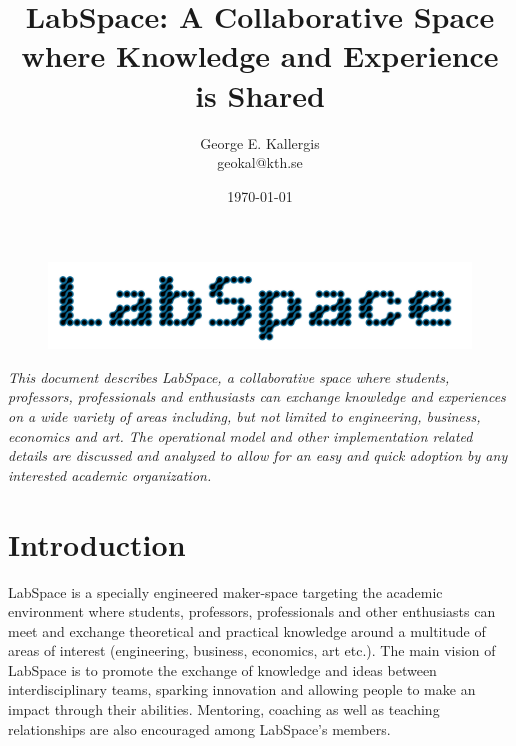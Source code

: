 \documentclass[a4paper, 11pt]{article}
\title{LabSpace: A Collaborative Space where Knowledge and Experience is Shared}
\author{George E. Kallergis\\geokal@kth.se}
\date{\today{}}
\begin{document}
\maketitle

\begin{figure}[h!]
  \begin{center}
    \includegraphics[width=\textwidth,height=\textheight,keepaspectratio]{imagery/logo.png}
    \label{fig:dneaf}
  \end{center}
\end{figure}

\textit{This document describes LabSpace, a collaborative space where students, professors, professionals and enthusiasts can exchange knowledge and experiences on a wide variety of areas including, but not limited to engineering, business, economics and art. The operational model and other implementation related details are discussed and analyzed to allow for an easy and quick adoption by any interested academic organization.}

\newpage

\section*{Introduction}
LabSpace is a specially engineered maker-space \cite{whatsamakerspace} targeting the academic environment where students, professors, professionals and other enthusiasts can meet and exchange theoretical and practical knowledge around a multitude of areas of interest (engineering, business, economics, art etc.). The main vision of LabSpace is to promote the exchange of knowledge and ideas between interdisciplinary teams, sparking innovation and allowing people to make an impact through their abilities. Mentoring, coaching as well as teaching relationships are also encouraged among LabSpace's members.
\end{document}
